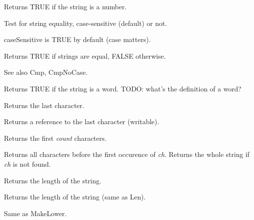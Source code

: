 Returns TRUE if the string is a number.

\label{wxstringissameas}


Test for string equality, case-sensitive (default) or not.

caseSensitive is TRUE by default (case matters).

Returns TRUE if strings are equal, FALSE otherwise.

See also Cmp, CmpNoCase.

\label{wxstringIsWord}


Returns TRUE if the string is a word. TODO: what's the definition of a word?

\label{wxstringLast}


Returns the last character.


Returns a reference to the last character (writable).

\label{wxstringleft}


Returns the first {\it count} characters.


Returns all characters before the first occurence of {\it ch}.
Returns the whole string if {\it ch} is not found.

\label{wxstringlen}


Returns the length of the string.

\label{wxstringlength}


Returns the length of the string (same as Len).

\label{wxstringLowerCase}


Same as MakeLower.

\label{wxstringmakelower}

